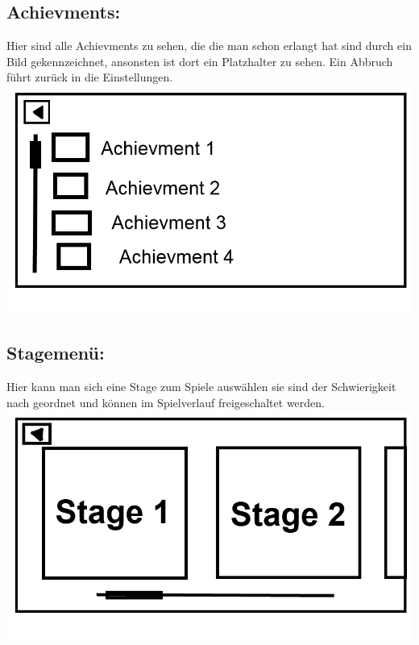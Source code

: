 \documentclass{scrartcl}
\begin{document}
\begin{enumerate}
	\begin{minipage}{1\textwidth}
		\item \subsection*{Achievments:}
		Hier sind alle Achievments zu sehen, die die man schon erlangt hat sind durch ein Bild gekennzeichnet, ansonsten ist dort ein Platzhalter zu sehen. Ein Abbruch führt zurück in die Einstellungen.\\
		\includegraphics[width=\textwidth, height=7.5cm]{assets/Achievments}
	\end{minipage}
	
	\begin{minipage}{1\textwidth}
		\item \subsection*{Stagemenü:}
		Hier kann man sich eine Stage zum Spiele auswählen sie sind der Schwierigkeit nach geordnet und können im Spielverlauf freigeschaltet werden.\\
		\includegraphics[width=\textwidth, height=7.5cm]{assets/Stagemenu}
	\end{minipage}
	

\end{enumerate}
\end{document}
